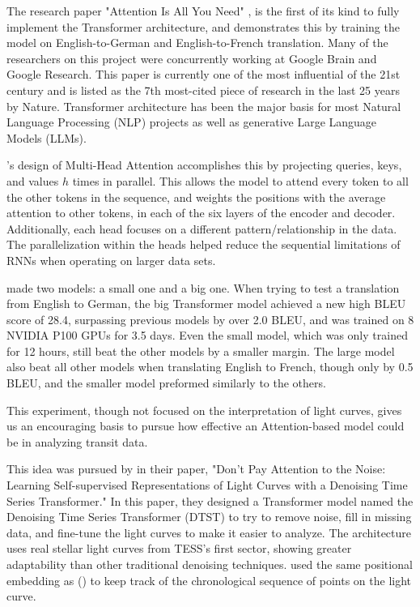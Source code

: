 \documentclass[letterpaper]{article} %
\begin{document}
The research paper "Attention Is All You Need" \cite{vaswani2017attentionneed}, is the first of its kind to fully implement the Transformer architecture, and demonstrates this by training the model on English-to-German and English-to-French translation. Many of the researchers on this project were concurrently working at Google Brain and Google Research. This paper is currently one of the most influential of the 21st century and is listed as the 7th most-cited piece of research in the last 25 years by Nature. Transformer architecture has been the major basis for most Natural Language Processing (NLP) projects as well as generative Large Language Models (LLMs).

\citeauthor{vaswani2017attentionneed}'s design of Multi-Head Attention accomplishes this by projecting queries, keys, and values $h$ times in parallel. This allows the model to attend every token to all the other tokens in the sequence, and weights the positions with the average attention to other tokens, in each of the six layers of the encoder and decoder. Additionally, each head focuses on a different pattern/relationship in the data. The parallelization within the heads helped reduce the sequential limitations of RNNs when operating on larger data sets. 

\citeauthor{vaswani2017attentionneed} made two models: a small one and a big one. When trying to test a translation from English to German, the big Transformer model achieved a new high BLEU score of 28.4, surpassing previous models by over 2.0 BLEU, and was trained on 8 NVIDIA P100 GPUs for 3.5 days. Even the small model, which was only trained for 12 hours, still beat the other models by a smaller margin. The large model also beat all other models when translating English to French, though only by 0.5 BLEU, and the smaller model preformed similarly to the others. 

This experiment, though not focused on the interpretation of light curves, gives us an encouraging basis to pursue how effective an Attention-based model could be in analyzing transit data.

This idea was pursued by \citeauthor{morvan2022dontpayattentionnoise} in their \citeyear{morvan2022dontpayattentionnoise} paper, "Don’t Pay Attention to the Noise: Learning Self-supervised Representations of Light Curves with a Denoising Time Series Transformer." In this paper, they designed a Transformer model named the Denoising Time Series Transformer (DTST) to try to remove noise, fill in missing data, and fine-tune the light curves to make it easier to analyze. The architecture uses real stellar light curves from TESS's first sector, showing greater adaptability than other traditional denoising techniques. \citeauthor{morvan2022dontpayattentionnoise} used the same positional embedding as \citeauthor{vaswani2017attentionneed} (\citeyear{vaswani2017attentionneed}) to keep track of the chronological sequence of points on the light curve. 
\end{document}

